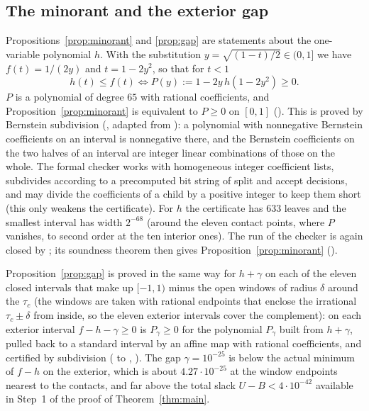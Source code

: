\documentclass[11pt]{amsart}
\theoremstyle{definition}
\theoremstyle{remark}
\begin{document}
\subsection{The minorant and the exterior gap}\label{sec:bernstein}

Propositions~\ref{prop:minorant} and \ref{prop:gap} are statements about the one-variable polynomial $h$. With the substitution $y=\sqrt{(1-t)/2}\in(0,1]$ we have $f(t)=1/(2y)$ and $t=1-2y^{2}$, so that for $t<1$
\[
  h(t)\le f(t)\iff P(y):=1-2y\,h(1-2y^{2})\ge0 .
\]
$P$ is a polynomial of degree $65$ with rational coefficients, and Proposition~\ref{prop:minorant} is equivalent to $P\ge0$ on $[0,1]$ (). This is proved by Bernstein subdivision (, adapted from \cite{ThomsonN9}): a polynomial with nonnegative Bernstein coefficients on an interval is nonnegative there, and the Bernstein coefficients on the two halves of an interval are integer linear combinations of those on the whole. The formal checker works with homogeneous integer coefficient lists, subdivides according to a precomputed bit string of split and accept decisions, and may divide the coefficients of a child by a positive integer to keep them short (this only weakens the certificate). For $h$ the certificate has $633$ leaves and the smallest interval has width $2^{-68}$ (around the eleven contact points, where $P$ vanishes, to second order at the ten interior ones). The run of the checker is again closed by ; its soundness theorem  then gives Proposition~\ref{prop:minorant} ().

Proposition~\ref{prop:gap} is proved in the same way for $h+\gamma$ on each of the eleven closed intervals that make up $[-1,1)$ minus the open windows of radius $\delta$ around the $\tau_c$ (the windows are taken with rational endpoints that enclose the irrational $\tau_c\pm\delta$ from inside, so the eleven exterior intervals cover the complement): on each exterior interval $f-h-\gamma\ge0$ is $P_\gamma\ge0$ for the polynomial $P_\gamma$ built from $h+\gamma$, pulled back to a standard interval by an affine map with rational coefficients, and certified by subdivision ( to , ). The gap $\gamma=10^{-25}$ is below the actual minimum of $f-h$ on the exterior, which is about $4.27\cdot10^{-25}$ at the window endpoints nearest to the contacts, and far above the total slack $U-B<4\cdot10^{-42}$ available in Step~1 of the proof of Theorem~\ref{thm:main}.
\end{document}
